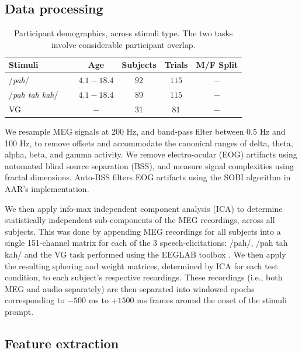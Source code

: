 \documentclass[a4paper]{article}
\begin{document}
\subsection{Data processing}

\begin{table}[t]
  \caption{Participant demographics, across stimuli type. The two tasks involve considerable participant overlap.}
  \label{tab:subjects}
  \centering
  \begin{tabular}{ l@{}c c c c }
    \toprule
    \multicolumn{1}{l}{\textbf{Stimuli}} & \multicolumn{1}{c}{\textbf{Age}} & \multicolumn{1}{c}{\textbf{Subjects}} & \multicolumn{1}{c}{\textbf{Trials}}  & \multicolumn{1}{c}{\textbf{M/F Split}} \\
    \midrule
    /{\em pah}/~~~                    & $4.1-18.4$   &   $92$   &   $115$   &   $-$ \\
    /{\em pah tah kah}/~~~                & $4.1-18.4$   &   $89$   &   $115$   &   $-$ \\
    VG~~~                      & $-$   &   $31$   &   $81$    &   $-$  \\
    \bottomrule
  \end{tabular}
\end{table}

We resample MEG signals at 200 Hz, and band-pass filter between 0.5 Hz and 100 Hz, to remove offsets and accommodate the canonical ranges of delta, theta, alpha, beta, and gamma activity. We remove electro-ocular (EOG) artifacts using automated blind source separation (BSS), and measure  signal complexities using fractal dimensions. Auto-BSS filters EOG artifacts using the SOBI algorithm in AAR's implementation.

We then apply info-max independent component analysis (ICA) \cite{Bell1995} to determine statistically independent sub-components of the MEG recordings, across all subjects. This was done by appending MEG recordings for all subjects into a single 151-channel matrix for each of the 3 speech-elicitations: /pah/, /pah tah kah/ and the VG task performed using the EEGLAB toolbox \cite{Delorme04eeglab}. We then apply the resulting sphering and weight matrices, determined by ICA for each test condition, to each subject's respective recordings. These recordings (i.e., both MEG and audio separately) are then separated into windowed epochs corresponding to $-500$ ms to $+1500$ ms frames around the onset of the stimuli prompt.

\subsection{Feature extraction}
\end{document}
